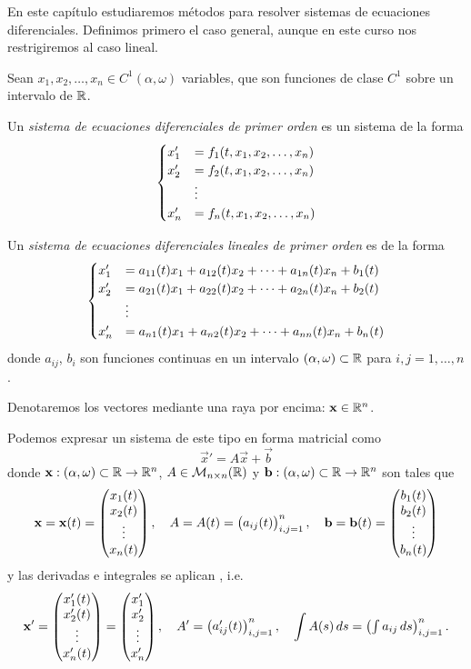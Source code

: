 \documentclass[../ecuaciones_diferenciales.tex]{subfiles}
\begin{document}
En este capítulo estudiaremos métodos para resolver sistemas de ecuaciones
diferenciales. Definimos primero el caso general, aunque en este curso nos
restrigiremos al caso lineal.

Sean \(x_1, x_2, \dots, x_n \in C^1(\alpha, \omega)\) variables, que son
funciones de clase \(C^1\) sobre un intervalo de \(\mathbb{R}\).

\begin{definition}
	Un \emph{sistema de ecuaciones diferenciales de primer orden} es un sistema de la
	forma
	\[\begin{cases}
			x'_1 &= f_1(t, x_1, x_2, \dots, x_n) \\
			x'_2 &= f_2(t, x_1, x_2, \dots, x_n) \\
			&\vdots \\
			x'_n &= f_n(t, x_1, x_2, \dots, x_n)\end{cases}\]
\end{definition}

\begin{definition}\label{def:siseq1ord}
	Un \emph{sistema de ecuaciones diferenciales lineales de primer orden} es de la
	forma
	\[\begin{cases}
			x'_1 &= a_{11}(t)x_1 + a_{12}(t)x_2 + \cdots + a_{1n}(t)x_n + b_1(t) \\
			x'_2 &= a_{21}(t)x_1 + a_{22}(t)x_2 + \cdots + a_{2n}(t)x_n + b_2(t) \\
			&\vdots \\
			x'_n &= a_{n1}(t)x_1 + a_{n2}(t)x_2 + \cdots + a_{nn}(t)x_n + b_n(t)\end{cases}\]
	donde \(a_{ij}\), \(b_i\) son funciones continuas en un intervalo
	\((\alpha, \omega) \subset \mathbb{R}\) para \(i,j = 1, \dots, n\).
\end{definition}

\begin{notation}
	Denotaremos los vectores mediante una raya por encima: \(\mathbf{x} \in \mathbb{R}^n\).
\end{notation}

Podemos expresar un sistema de este tipo en forma matricial como
\[\vec{x}' = A\vec{x} + \vec{b}\]
donde \(\mathbf{x} : (\alpha, \omega) \subset \mathbb{R} \to \mathbb{R}^n\),
\(A \in \mathcal{M}_{n \times n}(\mathbb{R})\) y
\(\mathbf{b} : (\alpha, \omega) \subset \mathbb{R} \to \mathbb{R}^n\) son tales que
\[\mathbf{x} = \mathbf{x}(t) = \begin{pmatrix}x_1(t) \\ x_2(t) \\ \vdots \\ x_n(t)\end{pmatrix}, \quad
	A = A(t) = \begin{pmatrix}a_{ij}(t)\end{pmatrix}^n_{i,j = 1},\quad
	\mathbf{b} = \mathbf{b}(t) = \begin{pmatrix}b_1(t) \\ b_2(t) \\ \vdots \\ b_n(t)\end{pmatrix} \]
y las derivadas e integrales se aplican ,
i.e.
\[\mathbf{x}' = \begin{pmatrix}x'_1(t) \\ x'_2(t) \\ \vdots \\ x'_n(t)\end{pmatrix}
	= \begin{pmatrix}x'_1 \\ x'_2 \\ \vdots \\ x'_n\end{pmatrix}, \quad
	A' = \begin{pmatrix}a'_{ij}(t)\end{pmatrix}^n_{i,j = 1}, \quad
	\int A(s) \mathop{d\!} s = \begin{pmatrix}\int a_{ij} \mathop{d\!} s\end{pmatrix}^n_{i,j = 1}.\]
\end{document}
